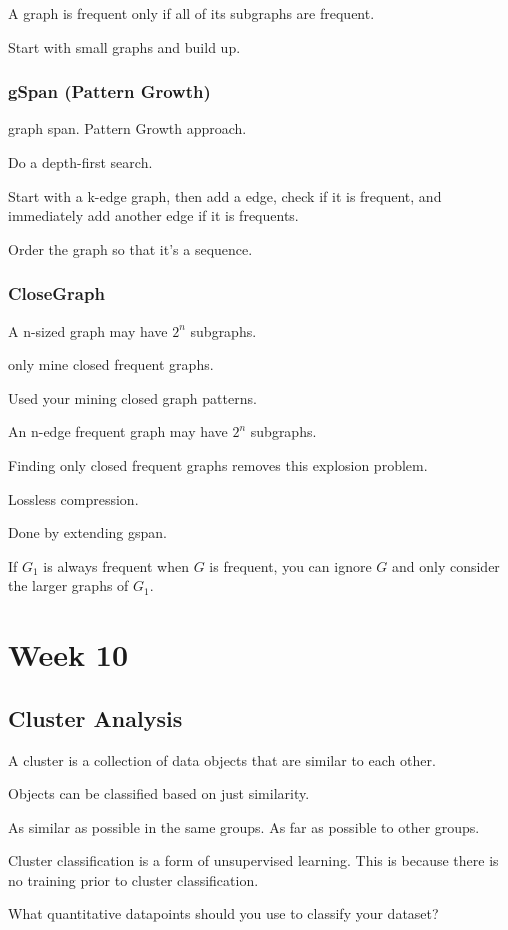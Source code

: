 \documentclass[fleqn]{report}
\begin{document}
A graph is frequent only if all of its subgraphs are frequent.

Start with small graphs and build up.

\subsection{gSpan (Pattern Growth)}
graph span. Pattern Growth approach. 

Do a depth-first search.

Start with a k-edge graph, then add a edge, check if it 
is frequent, and immediately add another edge if it is 
frequents.

Order the graph so that it's a sequence.

\subsection{CloseGraph}
A n-sized graph may have $2^n$ subgraphs.

only mine closed frequent graphs.

Used your mining closed graph patterns. 

An n-edge frequent graph may have $2^n$ subgraphs. 

Finding only closed frequent graphs removes this explosion problem.

Lossless compression. 

Done by extending gspan. 

If $G_1$ is always frequent when $G$ is frequent, you can 
ignore $G$ and only consider the larger graphs of $G_1$.

\chapter{Week 10}
\section{Cluster Analysis}
A cluster is a collection of data objects that 
are similar to each other. 

Objects can be classified based on just similarity.

As similar as possible in the same groups. As far as possible to other 
groups. 

Cluster classification is a form of unsupervised learning. This 
is because there is no training prior to cluster classification.

What quantitative datapoints should you use to classify your dataset?
\end{document}
